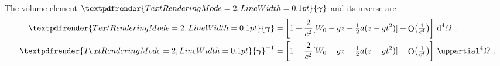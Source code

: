 \documentclass[a4paper,12pt,%
onecolumn,oneside,article,%
british%
]{memoir}
\makeatletter
\theoremstyle{remark}
\theoremstyle{innote}
\def\sum{\DOTSI\sumop\slimits@}
\newcommand*{\mathte}[1]{\bm{\mathsf{#1}}}
\newcommand*{\xbm}[1]{\textpdfrender{TextRenderingMode=2,LineWidth=0.1pt}{\boldsymbol{#1}}}
\newcommand*{\de}{\mathop{}\!\uppartial}%
\newcommand*{\di}{\mathop{}\!\mathrm{d}}%
\DeclareMathOperator{\Ord}{O}%
\newcommand*{\p}{\mathrm{p}}%
\renewcommand*{\|}[1][]{\nonscript\:#1\vert\nonscript\:\mathopen{}}
\newcommand*{\tsum}{\mathop{\textstyle\sum}\nolimits}
\newcommand*{\tttte}[1]{\de^{4}\varOmega^{#1}}
\newcommand*{\tttti}[1]{\di^{4}\varOmega_{#1}}
\newcommand*{\ve}{\xbm{\gamma}}%
\newcommand*{\vi}{\xbm{\gamma}^{-1}}%
\newcommand*{\yu}{\xbm{u}}
\newcommand*{\yo}{\xbm{\omega}}
\newcommand*{\yW}{W}
\newcommand*{\yF}{\mathte{F}}
\newcommand*{\yE}{\bm{E}}
\newcommand*{\Oc}[1]{\Ord\bigl(\tfrac{1}{c^{#1}}\bigr)}
\makeatother
\begin{document}
The volume element $\ve$ and its inverse are
\begin{equation}
  \label{eq:vol_element_accel}
  \begin{aligned}
    \ve &= \biggl[1 +
    \frac{2}{c^{2}} [\yW_0 - g z + \tfrac12 a (z - g t^2)]
    + \Oc{4} \biggr]\,\tttti{} \ ,
    \\\
    \vi &= \biggl[1 -
    \frac{2}{c^{2}} [\yW_0 - g z + \tfrac12 a (z - g t^2)]
    + \Oc{4}\biggr]\,\tttte{} \ .
  \end{aligned}
\end{equation}









\end{document}
